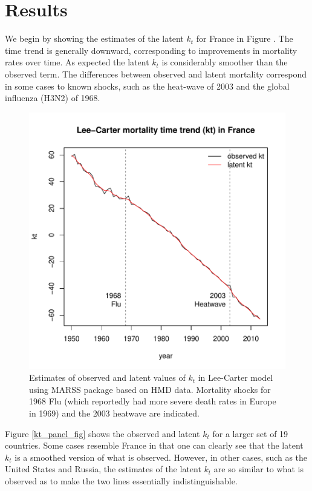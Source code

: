 \documentclass[12pt]{article}
\begin{document}
\section{Results}

We begin by showing the estimates of the latent $k_t$ for France in
Figure \label{france_fig}. The time trend is generally downward, corresponding to
improvements in mortality rates over time. As expected the latent
$k_t$ is considerably smoother than the observed term. The
differences between observed and latent mortality correspond in some
cases to known shocks, such as the heat-wave of 2003 and the
global influenza (H3N2) of 1968.


\begin{figure}
  \includegraphics[width=1.05\textwidth]{../code/france_example.pdf}
  \caption{Estimates of observed and latent values of $k_t$ in
    Lee-Carter model using MARSS package based on HMD data. Mortality
    shocks for 1968 Flu (which reportedly had more severe death rates
    in Europe in 1969) and the 2003 heatwave are indicated.}
    \label{france_fig}
\end{figure}


Figure \ref{kt_panel_fig} shows the observed and latent $k_t$ for a larger set of
19 countries. Some cases resemble France in that one can clearly see that
the latent $k_t$ is a smoothed version of what is observed. However,
in other cases, such as the United States and Russia, the estimates of
the latent $k_t$ are so similar to what is observed as to make the two
lines essentially indistinguishable.
\end{document}
